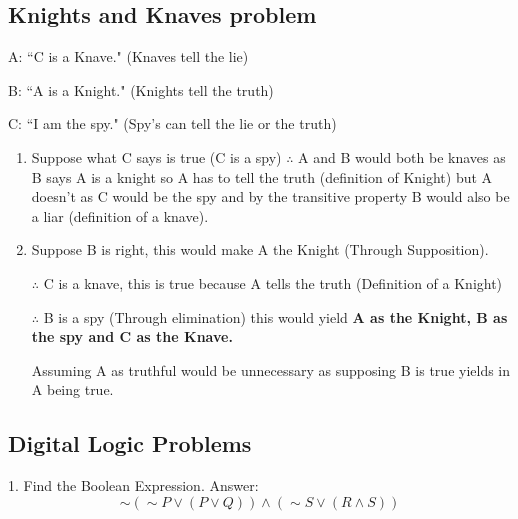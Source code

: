 \documentclass[11pt]{article}
\begin{document}
\hrulefill


	\subsection{Knights and Knaves problem}
	\begin{flushleft}
A: ``C is a Knave." (Knaves tell the lie)

B: ``A is a Knight." (Knights tell the truth)

C: ``I am the spy." (Spy's can tell the lie or the truth)


\begin{enumerate}
\item Suppose what C says is true (C is a spy) $\therefore$ A and B would both be knaves as B says A is a knight so A has to tell the truth (definition of Knight) but A doesn't as C would be the spy and by the transitive property B would also be a liar (definition of a knave).

\item Suppose B is right, this would make A the Knight (Through Supposition). 

$\therefore$ C is a knave, this is true because A tells the truth (Definition of a Knight)

$\therefore$ B is a spy (Through elimination) this would yield \textbf{A as the Knight, B as the spy and C as the Knave.}

Assuming A as truthful would be unnecessary as supposing B is true yields in A being true.



\end{enumerate}	
	
	\end{flushleft}
	
	
\hrulefill

	\subsection{Digital Logic Problems}
	
	1. Find the Boolean Expression. 
	Answer: $$\sim (\sim P \lor (P \lor Q))\land (\sim S \lor (R \land S))$$
	
\end{document}
